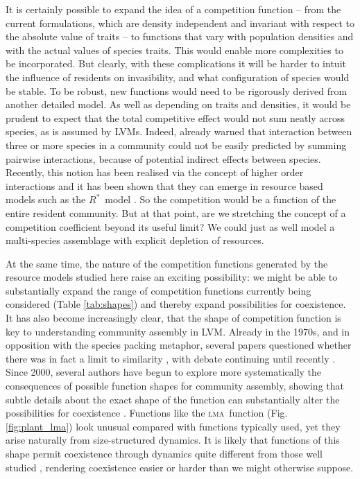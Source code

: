 \documentclass[a4paper,11pt]{article}
\newcommand{\Rstar}{\ensuremath{R^*}}
\newcommand{\lma}{\textsc{lma}}
\begin{document}
It is certainly possible to expand the idea of a competition function -- from the current formulations, which are density independent and invariant with respect to the absolute value of traits -- to functions that vary with population densities and with the actual values of species traits. This would enable more complexities to be incorporated. But clearly, with these complications it will be harder to intuit the influence of residents on invasibility, and what configuration of species would be stable. To be robust, new functions would need to be rigorously derived from another detailed model. As well as depending on traits and densities, it would be prudent to expect that the total competitive effect would not sum neatly across species, as is assumed by LVMs. Indeed, \citet{Levine-1976} already warned that interaction between three or more species in a community could not be easily predicted by summing pairwise interactions, because of potential indirect effects between species. Recently, this notion has been realised via the concept of higher order interactions \citep{Levine-2017} and it has been shown that they can emerge in resource based models such as the \Rstar\ model \citep{Letten-2019}. So the competition would be a function of the entire resident community. But at that point, are we stretching the concept of a competition coefficient beyond its useful limit? We could just as well model a multi-species assemblage with explicit depletion of resources.

At the same time, the nature of the competition functions generated by the resource models studied here raise an exciting possibility: we might be able to substantially expand the range of competition functions currently being considered (Table \ref{tab:shapes}) and thereby expand possibilities for coexistence. It has also become increasingly clear, that the shape of competition function is key to understanding community assembly in LVM. Already in the 1970s, and in opposition with the species packing metaphor, several papers questioned whether there was in fact a limit to similarity \citep{May-1972, Abrams-1975, Abrams-1983}, with debate continuing until recently \citep{Meszena-2006, Barabas-2012, Leimar-2013}. Since 2000, several authors have begun to explore more systematically the consequences of possible function shapes for community assembly, showing that subtle details about the exact shape of the function can substantially alter the possibilities for coexistence \citep{Calcagno-2006, Scheffer-2006, Pigolotti-2007, Barabas-2012,Barabas-2013,DAndrea-2013,Leimar-2013}. Functions like the \lma\ function (Fig. \ref{fig:plant_lma}) look unusual compared with functions typically used, yet they arise naturally from size-structured dynamics. It is likely that functions of this shape permit coexistence through dynamics quite different from those well studied \citep[e.g.][]{Leimar-2013}, rendering coexistence easier or harder than we might otherwise suppose.
\end{document}
